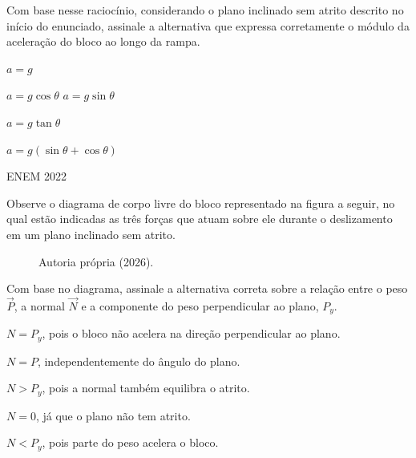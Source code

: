 \documentclass{beamer}
\begin{document}
{   Com base nesse raciocínio, considerando o plano inclinado sem atrito
   descrito no início do enunciado, assinale a alternativa que expressa
   corretamente o módulo da aceleração do bloco ao longo da rampa.

   \begin{alternativas}
     \item $a = g$
     \item $a = g\cos\theta$
     \itemCorreto $a = g\sin\theta$
     \item $a = g\tan\theta$
     \item $a = g(\sin\theta + \cos\theta)$
   \end{alternativas}}

\question
  {ENEM 2022}
  {Observe o diagrama de corpo livre do bloco representado na figura a
   seguir, no qual estão indicadas as três forças que atuam sobre ele
   durante o deslizamento em um plano inclinado sem atrito.

   \begin{figure}
   \IFCEimagemDummy{10.0cm}{6.0cm}
   \caption{Autoria própria (2026).}
   \end{figure}

   Com base no diagrama, assinale a alternativa correta sobre a relação
   entre o peso $\vec{P}$, a normal $\vec{N}$ e a componente do peso
   perpendicular ao plano, $P_y$.

   \begin{alternativas}
     \itemCorreto $N = P_y$, pois o bloco não acelera na direção
       perpendicular ao plano.
     \item $N = P$, independentemente do ângulo do plano.
     \item $N > P_y$, pois a normal também equilibra o atrito.
     \item $N = 0$, já que o plano não tem atrito.
     \item $N < P_y$, pois parte do peso acelera o bloco.
   \end{alternativas}}
\end{document}
